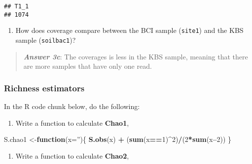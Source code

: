 \documentclass[
]{article}
\newenvironment{Shaded}{\begin{snugshade}}{\end{snugshade}}
\newcommand{\ControlFlowTok}[1]{\textcolor[rgb]{0.13,0.29,0.53}{\textbf{#1}}}
\newcommand{\DataTypeTok}[1]{\textcolor[rgb]{0.13,0.29,0.53}{#1}}
\newcommand{\DecValTok}[1]{\textcolor[rgb]{0.00,0.00,0.81}{#1}}
\newcommand{\KeywordTok}[1]{\textcolor[rgb]{0.13,0.29,0.53}{\textbf{#1}}}
\newcommand{\NormalTok}[1]{#1}
\newcommand{\OperatorTok}[1]{\textcolor[rgb]{0.81,0.36,0.00}{\textbf{#1}}}
\newcommand{\StringTok}[1]{\textcolor[rgb]{0.31,0.60,0.02}{#1}}
\providecommand{\tightlist}{%
  \setlength{\itemsep}{0pt}\setlength{\parskip}{0pt}}
\begin{document}
\begin{verbatim}
## T1_1 
## 1074
\end{verbatim}

\begin{enumerate}
\def\labelenumi{\alph{enumi}.}
\setcounter{enumi}{2}
\tightlist
\item
  How does coverage compare between the BCI sample (\texttt{site1}) and
  the KBS sample (\texttt{soilbac1})?
\end{enumerate}

\begin{quote}
\textbf{\emph{Answer 3c}}: The coverages is less in the KBS sample,
meaning that there are more samples that have only one read.
\end{quote}

\hypertarget{richness-estimators}{%
\subsubsection{Richness estimators}\label{richness-estimators}}

In the R code chunk below, do the following:

\begin{enumerate}
\def\labelenumi{\arabic{enumi}.}
\tightlist
\item
  Write a function to calculate \textbf{Chao1},
\end{enumerate}

\begin{Shaded}
\begin{Highlighting}[]
\NormalTok{S.chao1 <-}\ControlFlowTok{function}\NormalTok{(}\DataTypeTok{x=}\StringTok{''}\NormalTok{)\{}
  \KeywordTok{S.obs}\NormalTok{(x) }\OperatorTok{+}\StringTok{ }\NormalTok{(}\KeywordTok{sum}\NormalTok{(x}\OperatorTok{==}\DecValTok{1}\NormalTok{)}\OperatorTok{^}\DecValTok{2}\NormalTok{)}\OperatorTok{/}\NormalTok{(}\DecValTok{2}\OperatorTok{*}\KeywordTok{sum}\NormalTok{(x}\OperatorTok{--}\DecValTok{2}\NormalTok{))}
\NormalTok{\}}
\end{Highlighting}
\end{Shaded}

\begin{enumerate}
\def\labelenumi{\arabic{enumi}.}
\setcounter{enumi}{1}
\tightlist
\item
  Write a function to calculate \textbf{Chao2},
\end{enumerate}
\end{document}

